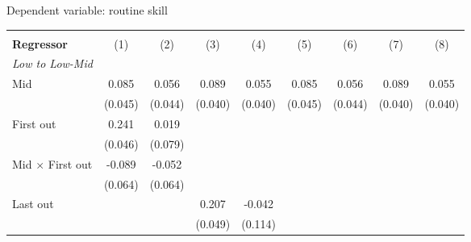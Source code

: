 \begin{center}
\begin{threeparttable}[!h]
\caption{Dependent variable: routine skill}
\begin{tabular}{lcccccccc}
\toprule
\toprule
&\multicolumn{1}{c}{\textbf{}}&\multicolumn{1}{c}{\textbf{}}&\multicolumn{1}{c}{\textbf{}}&\multicolumn{1}{c}{\textbf{}}&\multicolumn{1}{c}{\textbf{}}&\multicolumn{1}{c}{\textbf{}}&\multicolumn{1}{c}{\textbf{}}&\multicolumn{1}{c}{\textbf{}} \\
\textbf{Regressor}&\multicolumn{1}{c}{(1)}&\multicolumn{1}{c}{(2)}&\multicolumn{1}{c}{(3)}&\multicolumn{1}{c}{(4)}&\multicolumn{1}{c}{(5)}&\multicolumn{1}{c}{(6)}&\multicolumn{1}{c}{(7)}&\multicolumn{1}{c}{(8)} \\
\midrule
\textit{Low to Low-Mid} \\
Mid                 &       0.085         &       0.056         &       0.089\sym{*}  &       0.055         &       0.085         &       0.056         &       0.089\sym{*}  &       0.055         \\
                    &     (0.045)         &     (0.044)         &     (0.040)         &     (0.040)         &     (0.045)         &     (0.044)         &     (0.040)         &     (0.040)         \\
First out           &       0.241\sym{***}&       0.019         &                     &                     &                     &                     &                     &                     \\
                    &     (0.046)         &     (0.079)         &                     &                     &                     &                     &                     &                     \\
Mid $\times$ First out&      -0.089         &      -0.052         &                     &                     &                     &                     &                     &                     \\
                    &     (0.064)         &     (0.064)         &                     &                     &                     &                     &                     &                     \\
Last out            &                     &                     &       0.207\sym{***}&      -0.042         &                     &                     &                     &                     \\
                    &                     &                     &     (0.049)         &     (0.114)         &                     &                     &                     &                     \\

\end{tabular}
\end{threeparttable}
\end{center}
